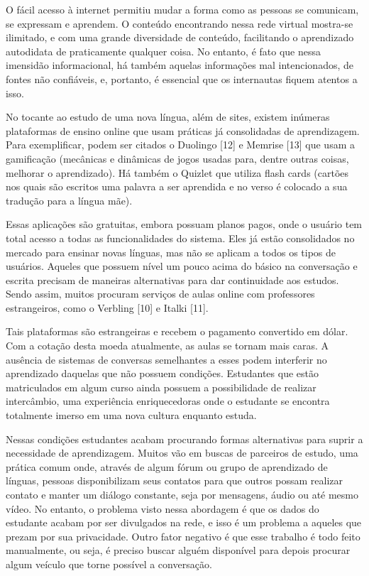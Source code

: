 O fácil acesso à internet permitiu mudar a forma como as pessoas se comunicam, se expressam e aprendem. O conteúdo encontrando nessa rede virtual mostra-se ilimitado, e com uma grande diversidade de conteúdo, facilitando o aprendizado autodidata de praticamente qualquer coisa. No entanto, é fato que nessa imensidão informacional, há também aquelas informações mal intencionados, de fontes não confiáveis, e, portanto,  é essencial que os internautas fiquem atentos a isso.

No tocante ao estudo de uma nova língua, além de sites, existem inúmeras plataformas de ensino online que usam práticas já consolidadas de aprendizagem. Para exemplificar, podem ser citados o Duolingo [12] e Memrise [13] que usam a gamificação (mecânicas e dinâmicas de jogos usadas para, dentre outras coisas, melhorar o aprendizado). Há também o Quizlet que utiliza flash cards (cartões nos quais são escritos uma palavra a ser aprendida e no verso é colocado a sua tradução para a língua mãe).

Essas aplicações são gratuitas, embora possuam planos pagos, onde o usuário tem total acesso a todas as funcionalidades do sistema. Eles já estão consolidados no mercado para ensinar novas línguas, mas não se aplicam a todos os tipos de usuários. Aqueles que possuem nível um pouco acima do básico na conversação e escrita precisam de maneiras alternativas para dar continuidade aos estudos. Sendo assim, muitos procuram serviços de aulas online com professores estrangeiros, como o Verbling [10] e Italki [11].

Tais plataformas são estrangeiras e recebem o pagamento convertido em dólar. Com a cotação desta moeda atualmente, as aulas se tornam mais caras. A ausência de sistemas de conversas semelhantes a esses podem interferir no aprendizado daquelas que não possuem condições. Estudantes que estão matriculados em algum curso ainda possuem a possibilidade de realizar intercâmbio, uma experiência enriquecedoras onde o estudante se encontra totalmente imerso em uma nova cultura enquanto estuda.

Nessas condições estudantes acabam procurando formas alternativas para suprir a necessidade de aprendizagem. Muitos vão em buscas de parceiros de estudo, uma prática comum onde, através de algum fórum ou grupo de aprendizado de línguas, pessoas disponibilizam seus contatos para que outros possam realizar contato e manter um diálogo constante, seja por mensagens, áudio ou até mesmo vídeo. No entanto, o problema visto nessa abordagem é que os dados do estudante acabam por ser divulgados na rede, e isso é um problema a aqueles que prezam por sua privacidade. Outro fator negativo é que esse trabalho é todo feito manualmente, ou seja, é preciso buscar alguém disponível para depois procurar algum veículo que torne possível a conversação.

